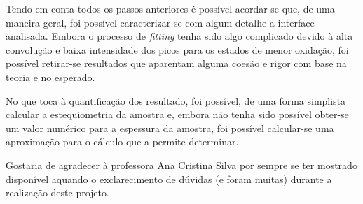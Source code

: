 \documentclass[baaa]{baaa}
\begin{document}
Tendo em conta todos os passos anteriores é possível acordar-se que, de uma maneira geral, foi possível caracterizar-se com algum detalhe a interface analisada. Embora o processo de \textit{fitting} tenha sido algo complicado devido à alta convolução e baixa intensidade dos picos para os estados de menor oxidação, foi possível retirar-se resultados que aparentam alguma coesão e rigor com base na teoria e no esperado.

No que toca à quantificação dos resultado, foi possível, de uma forma simplista calcular a estequiometria da amostra e, embora não tenha sido possível obter-se um valor numérico para a espessura da amostra, foi possível calcular-se uma aproximação para o cálculo que a permite determinar.


\begin{acknowledgement}
  Gostaria de agradecer à professora Ana Cristina Silva por sempre se ter mostrado disponível aquando o exclarecimento de dúvidas (e foram muitas) durante a realização deste projeto.
\end{acknowledgement}




\small

 
\end{document}
